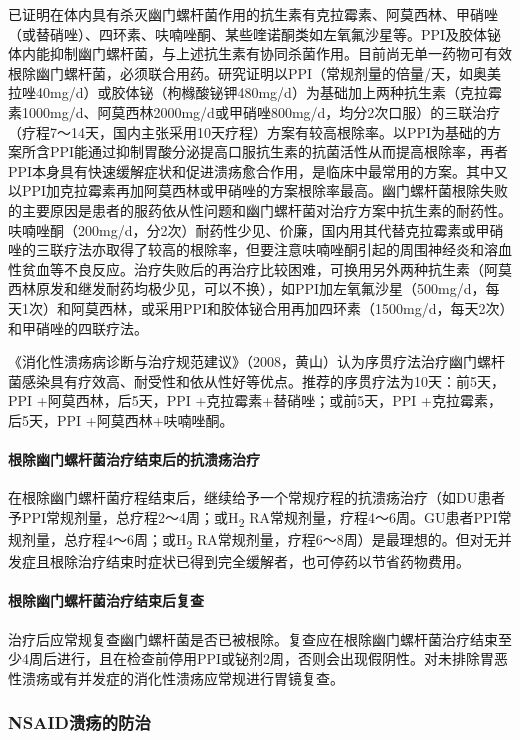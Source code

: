 已证明在体内具有杀灭幽门螺杆菌作用的抗生素有克拉霉素、阿莫西林、甲硝唑（或替硝唑）、四环素、呋喃唑酮、某些喹诺酮类如左氧氟沙星等。PPI及胶体铋体内能抑制幽门螺杆菌，与上述抗生素有协同杀菌作用。目前尚无单一药物可有效根除幽门螺杆菌，必须联合用药。研究证明以PPI（常规剂量的倍量/天，如奥美拉唑40mg/d）或胶体铋（枸橼酸铋钾480mg/d）为基础加上两种抗生素（克拉霉素1000mg/d、阿莫西林2000mg/d或甲硝唑800mg/d，均分2次口服）的三联治疗（疗程7～14天，国内主张采用10天疗程）方案有较高根除率。以PPI为基础的方案所含PPI能通过抑制胃酸分泌提高口服抗生素的抗菌活性从而提高根除率，再者PPI本身具有快速缓解症状和促进溃疡愈合作用，是临床中最常用的方案。其中又以PPI加克拉霉素再加阿莫西林或甲硝唑的方案根除率最高。幽门螺杆菌根除失败的主要原因是患者的服药依从性问题和幽门螺杆菌对治疗方案中抗生素的耐药性。呋喃唑酮（200mg/d，分2次）耐药性少见、价廉，国内用其代替克拉霉素或甲硝唑的三联疗法亦取得了较高的根除率，但要注意呋喃唑酮引起的周围神经炎和溶血性贫血等不良反应。治疗失败后的再治疗比较困难，可换用另外两种抗生素（阿莫西林原发和继发耐药均极少见，可以不换），如PPI加左氧氟沙星（500mg/d，每天1次）和阿莫西林，或采用PPI和胶体铋合用再加四环素（1500mg/d，每天2次）和甲硝唑的四联疗法。

《消化性溃疡病诊断与治疗规范建议》（2008，黄山）认为序贯疗法治疗幽门螺杆菌感染具有疗效高、耐受性和依从性好等优点。推荐的序贯疗法为10天：前5天，PPI
+阿莫西林，后5天，PPI +克拉霉素+替硝唑；或前5天，PPI
+克拉霉素，后5天，PPI +阿莫西林+呋喃唑酮。

\paragraph{根除幽门螺杆菌治疗结束后的抗溃疡治疗}

在根除幽门螺杆菌疗程结束后，继续给予一个常规疗程的抗溃疡治疗（如DU患者予PPI常规剂量，总疗程2～4周；或H\textsubscript{2}
RA常规剂量，疗程4～6周。GU患者PPI常规剂量，总疗程4～6周；或H\textsubscript{2}
RA常规剂量，疗程6～8周）是最理想的。但对无并发症且根除治疗结束时症状已得到完全缓解者，也可停药以节省药物费用。

\paragraph{根除幽门螺杆菌治疗结束后复查}

治疗后应常规复查幽门螺杆菌是否已被根除。复查应在根除幽门螺杆菌治疗结束至少4周后进行，且在检查前停用PPI或铋剂2周，否则会出现假阴性。对未排除胃恶性溃疡或有并发症的消化性溃疡应常规进行胃镜复查。

\subsubsection{NSAID溃疡的防治}

